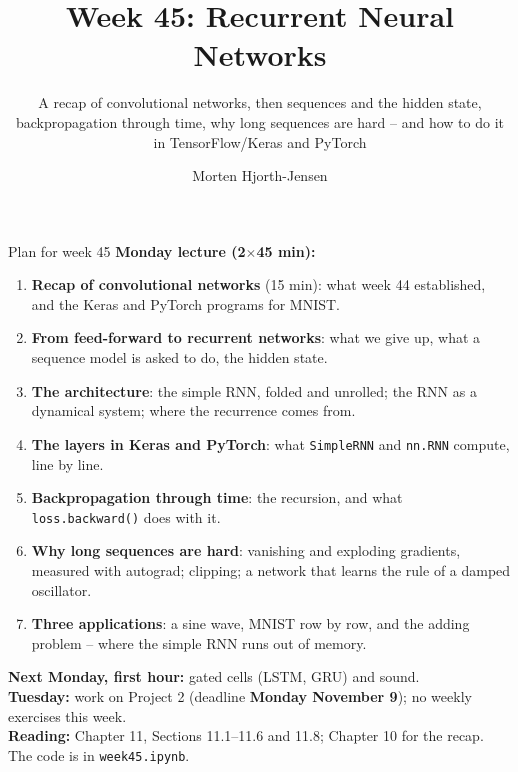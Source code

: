 \documentclass[10pt,aspectratio=169]{beamer}
\title{Week 45: Recurrent Neural Networks}
\subtitle{A recap of convolutional networks, then sequences and the hidden
  state, backpropagation through time, why long sequences are hard -- and
  how to do it in TensorFlow/Keras and PyTorch}
\author{Morten Hjorth-Jensen}
\institute{Department of Physics and Center for Computing in Science Education,\\
  University of Oslo, Norway}
\date{}
\begin{document}
\begin{frame}
\titlepage
\end{frame}

\begin{frame}{Plan for week 45}
\small
\textbf{Monday lecture (2$\times$45 min):}
\begin{enumerate}
  \item \textbf{Recap of convolutional networks} (15 min): what week 44
        established, and the Keras and PyTorch programs for MNIST.
  \item \textbf{From feed-forward to recurrent networks}: what we give up,
        what a sequence model is asked to do, the hidden state.
  \item \textbf{The architecture}: the simple RNN, folded and unrolled;
        the RNN as a dynamical system; where the recurrence comes from.
  \item \textbf{The layers in Keras and PyTorch}: what \texttt{SimpleRNN}
        and \texttt{nn.RNN} compute, line by line.
  \item \textbf{Backpropagation through time}: the recursion, and what
        \texttt{loss.backward()} does with it.
  \item \textbf{Why long sequences are hard}: vanishing and exploding
        gradients, measured with autograd; clipping; a network that learns
        the rule of a damped oscillator.
  \item \textbf{Three applications}: a sine wave, MNIST row by row, and
        the adding problem -- where the simple RNN runs out of memory.
\end{enumerate}
\medskip
\textbf{Next Monday, first hour:} gated cells (LSTM, GRU) and sound.\\
\textbf{Tuesday:} work on Project 2 (deadline \textbf{Monday November 9});
no weekly exercises this week.\\
\textbf{Reading:} Chapter 11, Sections 11.1--11.6 and 11.8; Chapter 10 for
the recap.  The code is in \texttt{week45.ipynb}.
\end{frame}

\end{document}
